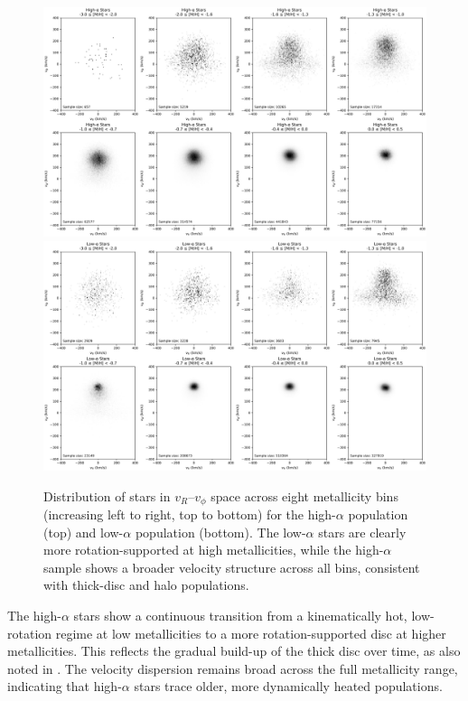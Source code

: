 \documentclass[a4paper,12pt]{article}
\begin{document}
\begin{figure}[H]
  \centering
  \includegraphics[width=\textwidth]{../figures/high_alpha.png}
  \vspace{0.5em}
  \includegraphics[width=\textwidth]{../figures/low_alpha.png}
  \caption{Distribution of stars in $v_R$–$v_\phi$ space across eight metallicity bins
           (increasing left to right, top to bottom) for the high-$\alpha$ population (top)
           and low-$\alpha$ population (bottom). The low-$\alpha$ stars are clearly more
           rotation-supported at high metallicities, while the high-$\alpha$ sample shows a
           broader velocity structure across all bins, consistent with thick-disc and halo populations.}
  \label{fig:vr_vphi_alpha}
\end{figure}

The high-$\alpha$ stars show a continuous transition from a kinematically hot, low-rotation regime at low 
metallicities to a more rotation-supported disc at higher metallicities. This reflects the gradual build-up 
of the thick disc over time, as also noted in \citet{Chandra_2024}. The velocity dispersion remains broad 
across the full metallicity range, indicating that high-$\alpha$ stars trace older, more dynamically heated 
populations.
\end{document}
